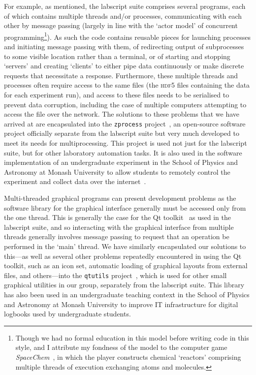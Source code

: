 For example, as mentioned, the labscript suite comprises several programs, each of which contains multiple threads and/or processes, communicating with each other by message passing (largely in line with the `actor model' of concurrent programming\footnote{Though we had no formal education in this model before writing code in this style, and I attribute my fondness of the model to the computer game \emph{SpaceChem}~\cite{zachtronics_industries_spacechem_2011}, in which the player constructs chemical `reactors' comprising multiple threads of execution exchanging atoms and molecules.}). As such the code contains reusable pieces for launching processes and initiating message passing with them, of redirecting output of subprocesses to some visible location rather than a terminal, or of starting and stopping `servers' and creating `clients' to either pipe data continuously or make discrete requests that necessitate a response. Furthermore, these multiple threads and processes often require access to the same files (the \textsc{hdf5} files containing the data for each experiment run), and access to these files needs to be serialised to prevent data corruption, including the case of multiple computers attempting to access the file over the network. The solutions to these problems that we have arrived at are encapsulated into the \texttt{zprocess} project~\cite{billington_zprocess_2018}, an open-source software project officially separate from the labscript suite but very much developed to meet its needs for multiprocessing. This project is used not just for the labscript suite, but for other laboratory automation tasks. It is also used in the software implementation of an undergraduate experiment in the School of Physics and Astronomy at Monash University to allow students to remotely control the experiment and collect data over the internet~\cite{monash_university_school_of_physics_and_astronomy_measurement_2016}.

Multi-threaded graphical programs can present development problems as the software library for the graphical interface generally must be accessed only from the one thread. This is generally the case for the Qt toolkit~\cite{the_qt_company_qt_2018} as used in the labscript suite, and so interacting with the graphical interface from multiple threads generally involves message passing to request that an operation be performed in the `main' thread. We have similarly encapsulated our solutions to this---as well as several other problems repeatedly encountered in using the Qt toolkit, such as an icon set, automatic loading of graphical layouts from external files, and others---into the \texttt{qtutils} project~\cite{starkey_qtutils_2018}, which is used for other small graphical utilities in our group, separately from the labscript suite. This library has also been used in an undergraduate teaching context in the School of Physics and Astronomy at Monash University to improve IT infrastructure for digital logbooks used by undergraduate students.

